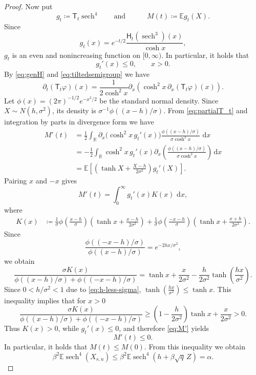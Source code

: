 \documentclass[11pt]{article}
\numberwithin{equation}{section}
\newcommand{\E}{\mathbb{E}}
\newcommand{\1}{\mathbf 1}
\newcommand{\sech}{\operatorname{sech}}
\newcommand{\dd}{\,\mathrm d}
\begin{document}
\begin{proof}
Now put
\[
 g_t\coloneqq\mathsf T_t \sech^4 \qquad \mbox{and}\quad
 \qquad
 M(t)\coloneqq\E g_t(X).
\]
Since
\[
 g_t(x)
 =
 e^{-t/2}\frac{\mathsf H_t(\sech^3)(x)}{\cosh x},
\]
$g_t$ is an even and nonincreasing function on $[0,\infty)$.
In particular, it holds that
\[
 g_t'(x)\le0,
 \qquad x>0.
\]
By \eqref{eq:genH} and \eqref{eq:tiltedsemigroup} we have
\begin{equation}\label{eq:partialT_t}
 \partial_t(\mathsf T_t\varphi)(x)
 =\frac{1}{2\cosh^2x}\partial_x\left(
   \cosh^2x\,\partial_x(\mathsf T_t\varphi)(x)
  \right).
\end{equation}
Let $\phi(x)=(2\pi)^{-1/2}e^{-x^2/2}$ be the standard normal density.
Since $X\sim N(h,\sigma^2)$, its density is
$\sigma^{-1}\phi((x-h)/\sigma)$.
From \eqref{eq:partialT_t} and integration by parts
in divergence form we have
\[
 \begin{aligned}
 M'(t)
 &=\frac12\int_{\mathbb R}
   \partial_x\bigl(\cosh^2x\,g_t'(x)\bigr)
   \frac{\phi((x-h)/\sigma)}{\sigma\cosh^2x}\,\dd x\\
 &=-\frac12\int_{\mathbb R}\cosh^2x\,g_t'(x)
   \partial_x\left(
     \frac{\phi((x-h)/\sigma)}{\sigma\cosh^2x}
   \right)\dd x\\
 &=\E\left[
   \left(\tanh X+\frac{X-h}{2\sigma^2}\right)g_t'(X)
 \right].
 \end{aligned}
\]
Pairing $x$ and $-x$
gives
\begin{equation}\label{eq:M'}
 M'(t)=\int_0^\infty g_t'(x)K(x)\,\dd x,
\end{equation}
where
\[
 \begin{aligned}
 K(x)
 &\coloneqq
 \frac1\sigma\phi\left(\frac{x-h}{\sigma}\right)
 \left(\tanh x+\frac{x-h}{2\sigma^2}\right)+
 \frac1\sigma\phi\left(\frac{-x-h}{\sigma}\right)
 \left(\tanh x+\frac{x+h}{2\sigma^2}\right).
 \end{aligned}
\]
Since
\[
 \frac{\phi((-x-h)/\sigma)}{\phi((x-h)/\sigma)}
 =e^{-2hx/\sigma^2},
\]
we obtain
\[
 \frac{\sigma K(x)}{
  \phi((x-h)/\sigma)+\phi((-x-h)/\sigma)}
 =
 \tanh x+\frac{x}{2\sigma^2}
 -\frac{h}{2\sigma^2}\tanh\left(\frac{hx}{\sigma^2}\right).
\]
Since $0<h/\sigma^2<1$ due to \eqref{eq:h-less-sigma},
\(
 \tanh\left(\frac{hx}{\sigma^2}\right)\le\tanh x .
\)
This inequality  implies that for $x>0$
\[
 \frac{\sigma K(x)}{
  \phi((x-h)/\sigma)+\phi((-x-h)/\sigma)}
 \ge
 \left(1-\frac{h}{2\sigma^2}\right)\tanh x
 +\frac{x}{2\sigma^2}
 >0.
\]
Thus $K(x)>0$, while $g_t'(x)\le0$, and therefore \eqref{eq:M'} yields
\[
 M'(t)\le0.
\]
In particular, it holds that $M(t)\le M(0)$. From this inequality we obtain
\[
 \beta^2\mathbb{E}\sech^4(X_{s,u})
 \le
 \beta^2\mathbb{E}\sech^4(h+\beta\sqrt q\,Z)
 =\alpha.
\]
\end{proof}
\end{document}
